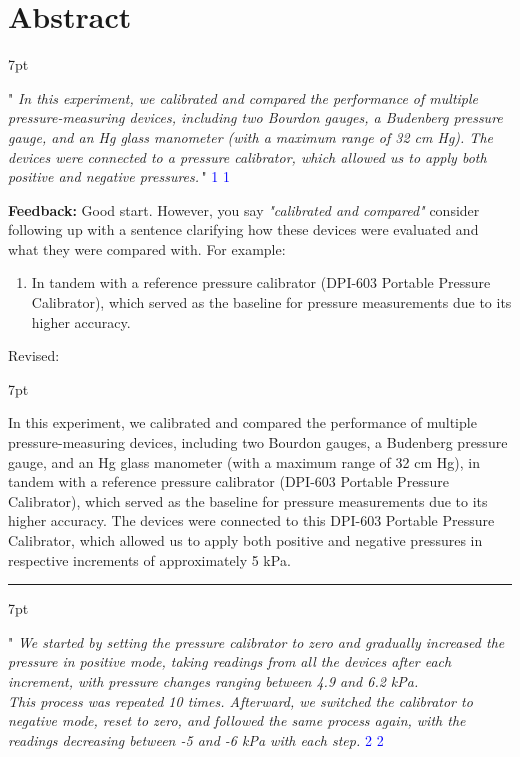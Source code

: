 \documentclass{article}
\newcommand{\formalsource}{} %
\newenvironment{formal}[3][]{%
	\renewcommand{\formalsource}{#1}%
	\def\FrameCommand{%
		\hspace{1pt}%
		{\color{#2}\vrule width 2pt}%
		{\color{#3}\vrule width 4pt}%
		\colorbox{#3}%
	}%
	\MakeFramed{\advance\hsize-\width\FrameRestore}%
	\noindent\hspace{-4.55pt}%
	\begin{adjustwidth}{}{7pt}%
		\vspace{2pt}%
	}%
	{%
		\vspace{4pt}%
		\ifx\formalsource\empty %
		\else
		\hfill{\footnotesize{\formalsource}}%
		\fi
	\end{adjustwidth}\endMakeFramed%
}
\begin{document}
\section{Abstract}
\begin{formal}[\textcolor{blue}{1}]{blue!40!black}{blue!10!white}
	\Large" \large \textit{In this experiment, we calibrated and compared the performance of multiple pressure-measuring devices, including two Bourdon gauges, a Budenberg pressure gauge, and an Hg glass manometer (with a maximum range of 32 cm Hg). The devices were connected to a pressure calibrator, which allowed us to apply both positive and negative pressures.}\Large\," \large   
\end{formal}
\textbf{Feedback:} Good start. However, you say \textit{"calibrated and compared"} consider following up with a sentence clarifying how these devices were evaluated and what they were compared with. For example:
\begin{enumerate}
	\item In tandem with a reference pressure calibrator (DPI-603 Portable Pressure Calibrator), which served as the baseline for pressure measurements due to its higher accuracy.  
\end{enumerate}
Revised:
\begin{formal}{green!40!black}{green!10!white}
	In this experiment, we calibrated and compared the performance of multiple pressure-measuring devices, including two Bourdon gauges, a Budenberg pressure gauge, and an Hg glass manometer (with a maximum range of 32 cm Hg), in tandem with a reference pressure calibrator (DPI-603 Portable Pressure Calibrator), which served as the baseline for pressure measurements due to its higher accuracy. The devices were connected to this DPI-603 Portable Pressure Calibrator, which allowed us to apply both positive and negative pressures in respective increments of approximately 5 kPa.
\end{formal}
\hrule
\begin{formal}[\textcolor{blue}{2}]{blue!40!black}{blue!10!white}
	\Large" \large \textit{We started by setting the pressure calibrator to zero and gradually increased the pressure in positive mode, taking readings from all the devices after each increment, with pressure changes ranging between 4.9 and 6.2 kPa.\\[1em]
	This process was repeated 10 times. Afterward, we switched the calibrator to negative mode, reset to zero, and followed the same process again, with the readings decreasing between -5 and -6 kPa with each step.}
\end{formal}
\end{document}

